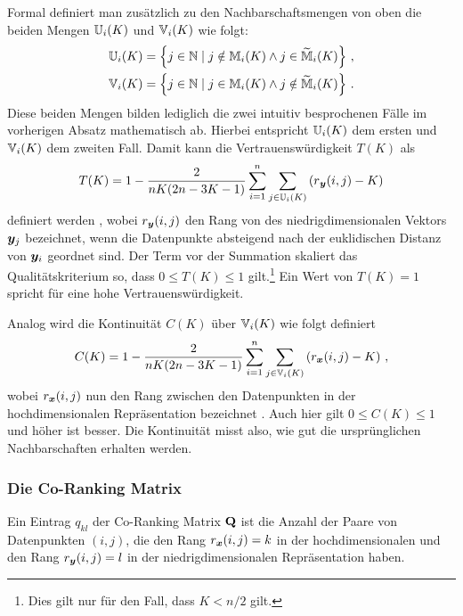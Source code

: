 Formal definiert man zusätzlich zu den Nachbarschaftsmengen von oben die beiden Mengen
$\mathbb{U}_i(K)$ und $\mathbb{V}_i(K)$ wie folgt:
\begin{gather}
	\mathbb{U}_i(K) =  \left\{ j \in \mathbb{N} \mid j \notin \mathbb{M}_i(K) \land j \in \widetilde{\mathbb{M}}_i(K) \right\} \, , \\
	\mathbb{V}_i(K) =  \left\{ j \in \mathbb{N} \mid j \in \mathbb{M}_i(K) \land j \notin \widetilde{\mathbb{M}}_i(K) \right\} \, .
\end{gather}
Diese beiden Mengen bilden lediglich die zwei intuitiv besprochenen Fälle im vorherigen Absatz mathematisch ab. Hierbei entspricht $\mathbb{U}_i(K)$ dem ersten und $\mathbb{V}_i(K)$ dem zweiten Fall.
Damit kann die Vertrauenswürdigkeit $T(K)$ als
\begin{equation}
	T(K) = 1 - \frac{2}{nK(2n - 3K - 1)} \sum_{i = 1}^{n}\sum_{j \in \set{U}_i(K) } \left( r­_{\vect{y}}(i, j) - K \right)
\end{equation}
definiert werden \parencite[487]{Venna.2001}, wobei $r_{\bm{y}}(i, j)$ den Rang von des niedrigdimensionalen Vektors
$\bm{y}_j$ bezeichnet, wenn die Datenpunkte absteigend nach der euklidischen Distanz von
$\bm{y}_i$ geordnet sind. Der Term vor der Summation skaliert das Qualitätskriterium so, dass $0
	\leq T(K) \leq 1$ gilt.\footnote{Dies gilt nur für den Fall, dass $K < n/2$ gilt.} Ein Wert von
$T(K) = 1­$ spricht für eine hohe Vertrauenswürdigkeit.

Analog wird die Kontinuität $C(K)$ über $\mathbb{V}_i(K)$ wie folgt definiert
\begin{equation}
	C(K) = 1 - \frac{2}{nK(2n - 3K - 1)} \sum_{i = 1}^{n}\sum_{j \in \mathbb{V}_i(K) } \left( r_{\bm{x}}(i, j) - K \right) \, ,
\end{equation}
wobei $r_{\bm{x}}(i, j)$ nun den Rang zwischen den Datenpunkten in der hochdimensionalen Repräsentation bezeichnet \parencite[487]{Venna.2001}. Auch hier gilt $0 \leq C(K) \leq 1$ und höher ist besser. Die Kontinuität
misst also, wie gut die ursprünglichen Nachbarschaften erhalten werden.  

\subsubsection{Die Co-Ranking Matrix}
Ein Eintrag $q_{kl}$ der Co-Ranking Matrix $\mathbf{Q}$ ist die Anzahl der Paare von Datenpunkten $(i,
	j)$, die den Rang $r_{\bm{x}}(i, j) = k$ in der hochdimensionalen und den Rang $r_{\bm{y}}(i,
	j) = l$ in der niedrigdimensionalen Repräsentation haben.

